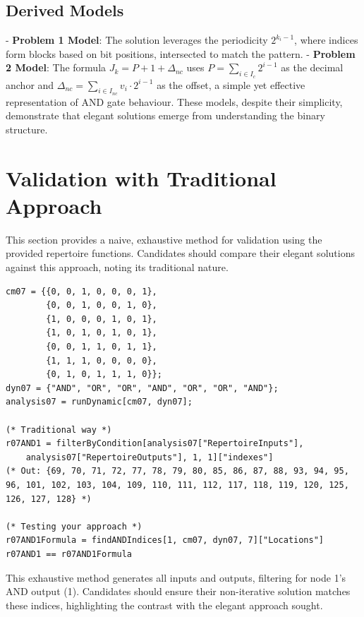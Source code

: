 \documentclass[12pt]{article}
\begin{document}
\subsection{Derived Models}
- \textbf{Problem 1 Model}: The solution leverages the periodicity \( 2^{k_i - 1} \), where indices form blocks based on bit positions, intersected to match the pattern.
- \textbf{Problem 2 Model}: The formula \( J_k = P + 1 + \Delta_{nc} \) uses \( P = \sum_{i \in I_c} 2^{i-1} \) as the decimal anchor and \( \Delta_{nc} = \sum_{i \in I_{nc}} v_i \cdot 2^{i-1} \) as the offset, a simple yet effective representation of AND gate behaviour.
These models, despite their simplicity, demonstrate that elegant solutions emerge from understanding the binary structure.

\section{Validation with Traditional Approach}
This section provides a naive, exhaustive method for validation using the provided repertoire functions. Candidates should compare their elegant solutions against this approach, noting its traditional nature.

\begin{lstlisting}[caption={Validation Script with Traditional Approach}]
cm07 = {{0, 0, 1, 0, 0, 0, 1},
        {0, 0, 1, 0, 0, 1, 0},
        {1, 0, 0, 0, 1, 0, 1},
        {1, 0, 1, 0, 1, 0, 1},
        {0, 0, 1, 1, 0, 1, 1},
        {1, 1, 1, 0, 0, 0, 0},
        {0, 1, 0, 1, 1, 1, 0}};
dyn07 = {"AND", "OR", "OR", "AND", "OR", "OR", "AND"};
analysis07 = runDynamic[cm07, dyn07];

(* Traditional way *)
r07AND1 = filterByCondition[analysis07["RepertoireInputs"], 
    analysis07["RepertoireOutputs"], 1, 1]["indexes"]
(* Out: {69, 70, 71, 72, 77, 78, 79, 80, 85, 86, 87, 88, 93, 94, 95, 96, 101, 102, 103, 104, 109, 110, 111, 112, 117, 118, 119, 120, 125, 126, 127, 128} *)

(* Testing your approach *)
r07AND1Formula = findANDIndices[1, cm07, dyn07, 7]["Locations"]
r07AND1 == r07AND1Formula
\end{lstlisting}
This exhaustive method generates all inputs and outputs, filtering for node 1’s AND output (1). Candidates should ensure their non-iterative solution matches these indices, highlighting the contrast with the elegant approach sought.
\end{document}
